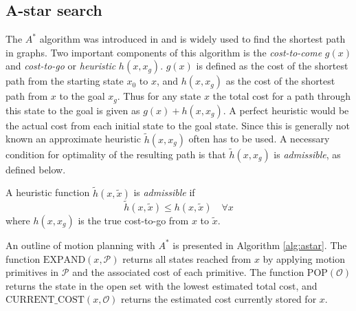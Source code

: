 \subsection{A-star search}\label{sec:a-star}
The $A^*$ algorithm was introduced in \cite{astar} and is widely used to find the shortest path in graphs.
Two important components of this algorithm is the \textit{cost-to-come} $g(x)$ and \textit{cost-to-go} or \textit{heuristic} $h(x,x_g)$. $g(x)$ is defined as 
the cost of the shortest path from the starting state $x_0$ to $x$, and $h(x, x_g)$ as the cost of the shortest path from $x$ to the goal $x_g$.
Thus for any state $x$ the total cost for a path through this state to the goal is given as $g(x)+h(x,x_g)$.
A perfect heuristic would be the actual cost from each initial state to the goal state. 
Since this is generally not known an approximate heuristic $\tilde{h}(x, x_g)$ often has to be used. A necessary 
condition for optimality of the resulting path is that $\tilde{h}(x, x_g)$ is \textit{admissible}, as defined below.

\begin{definition}
    A heuristic function $\tilde{h}(x, \tilde{x})$ is \textit{admissible} if
    \begin{equation}
        \tilde{h}(x, \tilde{x})\leq h(x, \tilde{x}) \quad\forall x
    \end{equation}
    where $h(x, x_g)$ is the true cost-to-go from $x$ to $\tilde{x}$.    
\end{definition}

An outline of motion planning with $A^*$ is presented in Algorithm \ref{alg:astar}.
The function $\text{EXPAND}(x, \mathcal{P})$ returns all states reached from $x$ by applying motion primitives in $\mathcal{P}$ and the associated cost of each primitive. The function $\text{POP}(\mathcal{O})$ returns the state in
the open set with the lowest estimated total cost, 
and \\$\text{CURRENT\_COST}(x,\mathcal{O})$  returns the estimated cost currently stored for $x$. 


